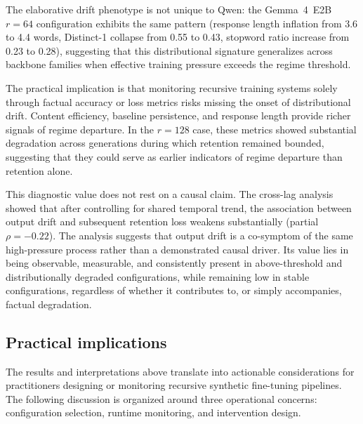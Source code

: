 \documentclass[a4paper,fleqn]{cas-dc}
\begin{document}
The elaborative drift phenotype is not unique to Qwen: the Gemma~4~E2B $r=64$
configuration exhibits the same pattern (response length inflation from 3.6 to
4.4 words, Distinct-1 collapse from 0.55 to 0.43, stopword ratio increase from
0.23 to 0.28), suggesting that this distributional signature generalizes across
backbone families when effective training pressure exceeds the regime threshold.

The practical implication is that monitoring recursive training systems solely
through factual accuracy or loss metrics risks missing the onset of
distributional drift. Content efficiency, baseline persistence, and response
length provide richer signals of regime departure. In the $r=128$ case, these
metrics showed substantial degradation across generations during which retention
remained bounded, suggesting that they could serve as earlier indicators of
regime departure than retention alone.

This diagnostic value does not rest on a causal claim. The
cross-lag analysis showed that after controlling for shared temporal trend, the
association between output drift and subsequent retention loss weakens
substantially (partial $\rho = -0.22$). The analysis suggests that output drift is a
co-symptom of the same high-pressure process rather than a demonstrated causal
driver. Its value lies in being observable, measurable, and consistently present
in above-threshold and distributionally degraded configurations, while remaining
low in stable configurations, regardless of whether it contributes to, or simply
accompanies, factual degradation.

\subsection{Practical implications}\label{sec:disc_practical}

The results and interpretations above translate into actionable considerations
for practitioners designing or monitoring recursive synthetic fine-tuning
pipelines. The following discussion is organized around three operational concerns: configuration
selection, runtime monitoring, and intervention design.
\end{document}
